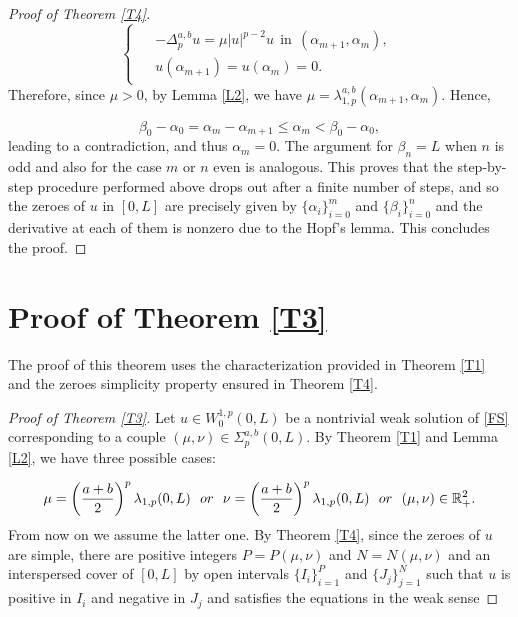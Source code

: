 \documentclass[a4paper,11pt]{article}
\newcommand{\R}{\mathbb{R}}
\begin{document}
{\begin{proof}[Proof of Theorem \ref{T4}]
\begin{equation}
\begin{cases}
\begin{aligned}
& - \Delta_{p}^{a,b} u = \mu|u|^{p-2}u \ \ \text{in} \ \ (\alpha_{m + 1},\alpha_{m}), \\
& u(\alpha_{m+1}) = u(\alpha_{m}) = 0.
\end{aligned}
\end{cases}
\end{equation}
Therefore, since $\mu > 0$, by Lemma \ref{L2}, we have $\mu = \lambda_{1,p}^{a,b}(\alpha_{m+1},\alpha_{m})$. Hence,

\[
\beta_{0}-\alpha_{0} = \alpha_{m}-\alpha_{m+1} \leq \alpha_{m} < \beta_{0}-\alpha_{0},
\]
leading to a contradiction, and thus $\alpha_{m} = 0$. The argument for $\beta_{n} = L$ when $n$ is odd and also for the case $m$ or $n$ even is analogous. This proves that the step-by-step procedure performed above drops out after a finite number of steps, and so the zeroes of $u$ in $[0,L]$ are precisely given by $\{\alpha_{i}\}_{i=0}^{m}$ and $\{\beta_{i}\}_{i=0}^{n}$ and the derivative at each of them is nonzero due to the Hopf's lemma. This concludes the proof.
\end{proof}

\section{Proof of Theorem \ref{T3}}

The proof of this theorem uses the characterization provided in Theorem \ref{T1} and the zeroes simplicity property ensured in Theorem \ref{T4}.

\begin{proof}[Proof of Theorem \ref{T3}] Let $u \in W_0^{1,p}(0,L)$ be a nontrivial weak solution of \eqref{FS} corresponding to a couple $(\mu, \nu) \in \Sigma^{a,b}_p(0,L)$. By Theorem \ref{T1} and Lemma \ref{L2}, we have three possible cases:

\[
\mu = \left( \frac{a + b}{2} \right)^p \lambda_{1,p}(0,L)\ \ {\rm or}\ \ \nu = \left( \frac{a + b}{2} \right)^p \lambda_{1,p}(0,L)\ \ {\rm or}\ \ (\mu, \nu) \in \R_+^2.
\]
From now on we assume the latter one. By Theorem \ref{T4}, since the zeroes of $u$ are simple, there are positive integers $P = P(\mu, \nu)$ and $N = N(\mu, \nu)$ and an interspersed cover of $[0,L]$ by open intervals $\{I_i\}^P_{i=1}$ and $\{J_j\}^N_{j=1}$ such that $u$ is positive in $I_i$ and negative in $J_j$ and satisfies the equations in the weak sense


\end{proof}}
\end{document}
